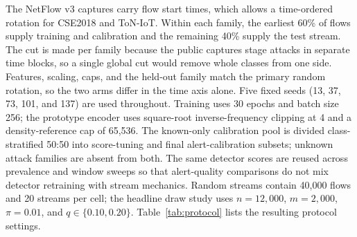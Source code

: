 \documentclass[a4paper,fleqn]{cas-dc}
\begin{document}
The NetFlow v3 captures carry flow start times, which allows a time-ordered rotation for CSE2018 and ToN-IoT. Within each family, the earliest 60\% of flows supply training and calibration and the remaining 40\% supply the test stream. The cut is made per family because the public captures stage attacks in separate time blocks, so a single global cut would remove whole classes from one side. Features, scaling, caps, and the held-out family match the primary random rotation, so the two arms differ in the time axis alone. Five fixed seeds (13, 37, 73, 101, and 137) are used throughout. Training uses 30 epochs and batch size 256; the prototype encoder uses square-root inverse-frequency clipping at 4 and a density-reference cap of 65,536. The known-only calibration pool is divided class-stratified 50:50 into score-tuning and final alert-calibration subsets; unknown attack families are absent from both. The same detector scores are reused across prevalence and window sweeps so that alert-quality comparisons do not mix detector retraining with stream mechanics. Random streams contain 40,000 flows and 20 streams per cell; the headline draw study uses $n=12{,}000$, $m=2{,}000$, $\pi=0.01$, and $q\in\{0.10,0.20\}$. Table~\ref{tab:protocol} lists the resulting protocol settings.
\end{document}
